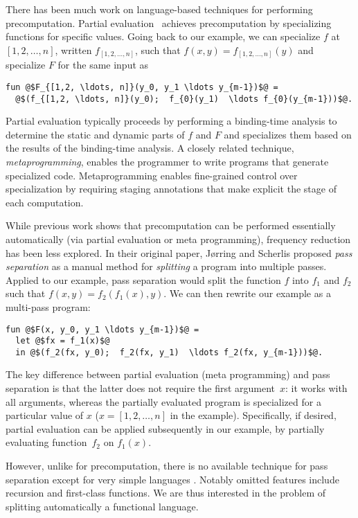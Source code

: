 There has been much work on language-based techniques for performing
precomputation. Partial evaluation~\cite{futamura71,jones96} achieves
precomputation by specializing functions for specific values. Going back to our
example, we can specialize $f$ at $[1,2, \ldots, n]$, written $f_{[1,2, \ldots,
n]}$, such that $f(x,y) = f_{[1,2, \ldots, n]}(y)$ and specialize $F$ for the
same input as
\begin{lstlisting}
fun @$F_{[1,2, \ldots, n]}(y_0, y_1 \ldots y_{m-1})$@ = 
  @$(f_{[1,2, \ldots, n]}(y_0);  f_{0}(y_1)  \ldots f_{0}(y_{m-1}))$@.
\end{lstlisting}
%
Partial evaluation typically proceeds by performing a
binding-time analysis to determine the static and dynamic parts of $f$
and $F$ and specializes them based on the results of the binding-time
analysis. A closely related technique, {\em metaprogramming}, enables
the programmer to write programs that generate specialized code.
Metaprogramming enables fine-grained control over specialization by
requiring staging annotations that make explicit the stage of each
computation.

While previous work shows that precomputation can be performed
essentially automatically (via partial evaluation or meta
programming), frequency reduction has been less explored.  In their
original paper, J{\o}rring and Scherlis proposed {\em pass separation}
as a manual method for {\em splitting} a program into multiple passes.
%
Applied to our example, pass separation would split the function $f$
into $f_1$ and $f_2$ such that $f(x,y) = f_2(f_1(x),y)$.  We can then
rewrite our example as a multi-pass program:
%
\begin{lstlisting}
fun @$F(x, y_0, y_1 \ldots y_{m-1})$@ = 
  let @$fx = f_1(x)$@
  in @$(f_2(fx, y_0);  f_2(fx, y_1)  \ldots f_2(fx, y_{m-1}))$@.
\end{lstlisting}
%
The key difference between partial evaluation (meta programming) and
pass separation is that the latter does not require the first
argument~$x$: it works with all arguments, whereas the partially
evaluated program is specialized for a particular value of $x$ ($x =
[1,2, \ldots, n]$ in the example). Specifically, if desired, partial
evaluation can be applied subsequently in our example, by partially
evaluating function~$f_2$ on $f_1(x)$.

However, unlike for precomputation, there is no available technique
for pass separation except for very simple languages
\cite{knoblock96,Proudfoot:2001,Foley:2011,He:2014}.  Notably omitted
features include recursion and first-class functions.  We are thus
interested in the problem of splitting automatically a functional
language.
%

